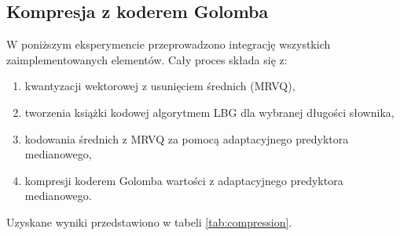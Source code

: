 \documentclass{article}
\begin{document}
\subsection{Kompresja z koderem Golomba}

W poniższym eksperymencie przeprowadzono integrację wszystkich zaimplementowanych elementów. Cały proces składa się z:

\begin{enumerate}
    \item kwantyzacji wektorowej z usunięciem średnich (MRVQ),
    \item tworzenia książki kodowej algorytmem LBG dla wybranej długości słownika,
    \item kodowania średnich z MRVQ za pomocą adaptacyjnego predyktora medianowego,
    \item kompresji koderem Golomba wartości z adaptacyjnego predyktora medianowego.
\end{enumerate}

Uzyskane wyniki przedstawiono w tabeli \ref{tab:compression}.
\end{document}
